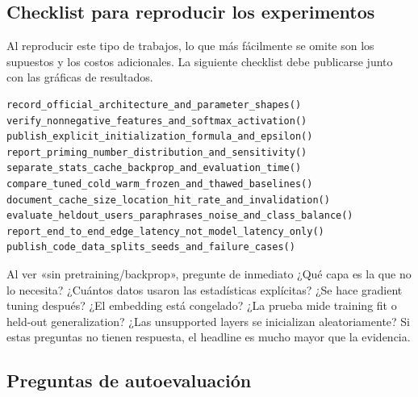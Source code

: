 \subsection{Checklist para reproducir los experimentos}

Al reproducir este tipo de trabajos, lo que más fácilmente se omite son los supuestos y los costos adicionales. La siguiente checklist debe publicarse junto con las gráficas de resultados.

\begin{lstlisting}[caption={Lista de reproducción y publicación de SAFFU/PLM}]
record_official_architecture_and_parameter_shapes()
verify_nonnegative_features_and_softmax_activation()
publish_explicit_initialization_formula_and_epsilon()
report_priming_number_distribution_and_sensitivity()
separate_stats_cache_backprop_and_evaluation_time()
compare_tuned_cold_warm_frozen_and_thawed_baselines()
document_cache_size_location_hit_rate_and_invalidation()
evaluate_heldout_users_paraphrases_noise_and_class_balance()
report_end_to_end_edge_latency_not_model_latency_only()
publish_code_data_splits_seeds_and_failure_cases()
\end{lstlisting}

\begin{warningbox}{Al ver «sin pretraining/backprop», pregunte de inmediato}
¿Qué capa es la que no lo necesita? ¿Cuántos datos usaron las estadísticas explícitas? ¿Se hace gradient tuning después? ¿El embedding está congelado? ¿La prueba mide training fit o held-out generalization? ¿Las unsupported layers se inicializan aleatoriamente? Si estas preguntas no tienen respuesta, el headline es mucho mayor que la evidencia.
\end{warningbox}

\subsection{Preguntas de autoevaluación}


